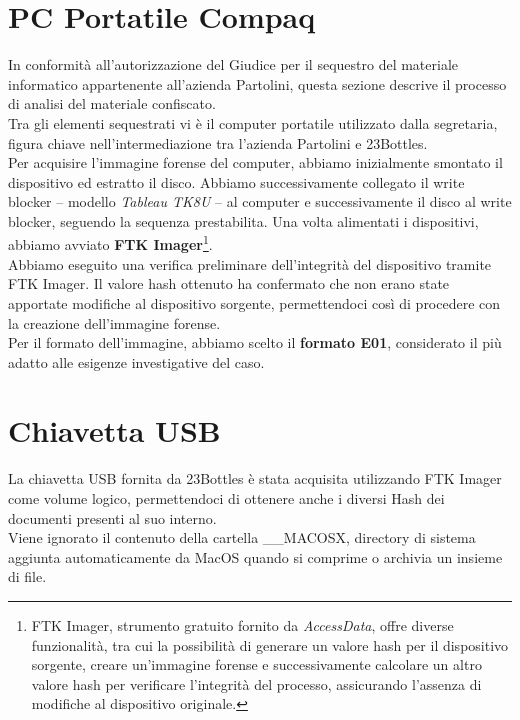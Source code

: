 \section{PC Portatile Compaq}
In conformità all’autorizzazione del Giudice per il sequestro del materiale informatico appartenente all’azienda Partolini, questa sezione descrive il processo di analisi del materiale confiscato.\\
Tra gli elementi sequestrati vi è il computer portatile utilizzato dalla segretaria, figura chiave nell’intermediazione tra l’azienda Partolini e 23Bottles.\vspace{14pt}\\
Per acquisire l’immagine forense del computer, abbiamo inizialmente smontato il dispositivo ed estratto il disco. Abbiamo successivamente collegato il write blocker -- modello \textit{Tableau TK8U} --  al computer e successivamente il disco al write blocker, seguendo la sequenza prestabilita. Una volta alimentati i dispositivi, abbiamo avviato \textbf{FTK Imager}\footnote{FTK Imager, strumento gratuito fornito da \textit{AccessData}, offre diverse funzionalità, tra cui la possibilità di generare un valore hash per il dispositivo sorgente, creare un’immagine forense e successivamente calcolare un altro valore hash per verificare l’integrità del processo, assicurando l’assenza di modifiche al dispositivo originale.}.\vspace{14pt}\\
Abbiamo eseguito una verifica preliminare dell’integrità del dispositivo tramite FTK Imager. Il valore hash ottenuto ha confermato che non erano state apportate modifiche al dispositivo sorgente, permettendoci così di procedere con la creazione dell’immagine forense.\vspace{14pt}\\
Per il formato dell’immagine, abbiamo scelto il \textbf{formato E01}, considerato il più adatto alle esigenze investigative del caso.

\section{Chiavetta USB}
La chiavetta USB fornita da 23Bottles è stata acquisita utilizzando FTK Imager come volume logico, permettendoci di ottenere anche i diversi Hash dei documenti presenti al suo interno.\vspace{14pt}\\
Viene ignorato il contenuto della cartella \_\_MACOSX, directory di sistema aggiunta automaticamente da MacOS quando si comprime o archivia un insieme di file.